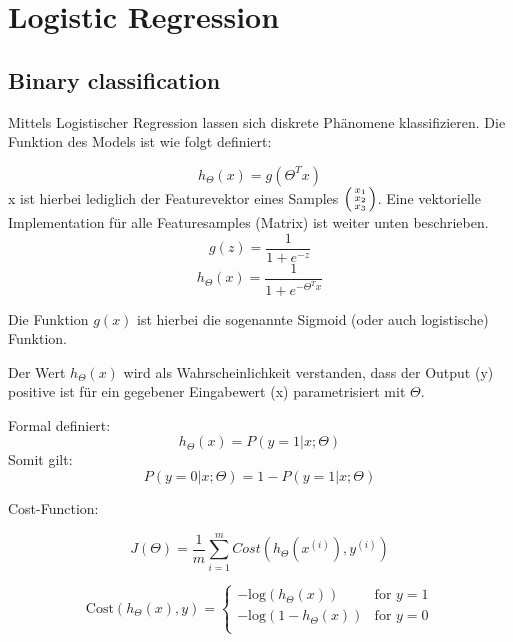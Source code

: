 \newpage
\section{Logistic Regression}
\subsection{Binary classification}
\begin{flushleft}


Mittels Logistischer Regression lassen sich diskrete Phänomene klassifizieren. Die Funktion des Models ist wie folgt definiert:


$$ h_{\Theta}(x) = g(\Theta^{T}x) $$ 
x ist hierbei lediglich der Featurevektor eines Samples $\left(\begin{smallmatrix}x_{1}\\x_{2}\\x_{3}\end{smallmatrix}\right)$. Eine vektorielle Implementation für alle Featuresamples (Matrix) ist weiter unten beschrieben.
$$ g(z) = \frac{1}{1 + e^{-z}} $$
$$ h_{\Theta}(x) = \frac{1}{1 + e^{-\Theta^{T}x}} $$

Die Funktion $g(x)$ ist hierbei die sogenannte Sigmoid (oder auch logistische) Funktion.


Der Wert $h_{\Theta}(x)$ wird als Wahrscheinlichkeit verstanden, dass der Output (y) positive ist für ein gegebener Eingabewert (x) parametrisiert mit $\Theta$.
\linebreak

Formal definiert:
$$h_{\Theta}(x) = P(y=1|x;\Theta)$$
Somit gilt:
$$ P(y=0|x;\Theta) = 1 - P(y=1|x;\Theta)$$



Cost-Function:

$$ J(\Theta) = \frac{1}{m}\sum_{i=1}^{m}Cost(h_{\Theta}(x^{(i)}), y^{(i)}) $$


$$ \text{Cost}(h_{\Theta}(x), y) =
    \begin{cases}
      -\text{log}(h_{\Theta}(x)) & \text{for } y=1\\
      -\text{log}(1 - h_{\Theta}(x)) & \text{for } y=0\\
    \end{cases} $$


\end{flushleft}
